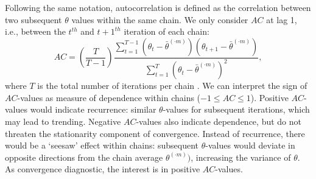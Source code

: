 \documentclass[article]{jss}
\begin{document}
Following the same notation, autocorrelation is defined as the correlation between two subsequent $\theta$ values within the same chain. We only consider $AC$ at lag 1, i.e., between the $t^{th}$ and $t+1^{th}$ iteration of each chain: 
%
\begin{equation*}
AC = \left( \frac{T}{T-1} \right) \frac{\sum_{t=1}^{T-1}(\theta_t - \bar{\theta}^{(\cdot m)})(\theta_{t+1} - \bar{\theta}^{(\cdot m)})}{\sum_{t=1}^{T}(\theta_t - \bar{\theta}^{(\cdot m)})^2},
\end{equation*}
%
where $T$ is the total number of iterations per chain \citep[p.~147]{lync07}. We can interpret the sign of $AC$-values as measure of dependence within chains ($-1 \leq AC \leq 1$). Positive $AC$-values would indicate recurrence: similar $\theta$-values for subsequent iterations, which may lead to trending. Negative $AC$-values also indicate dependence, but do not threaten the stationarity component of convergence. Instead of recurrence, there would be a `seesaw' effect within chains: subsequent $\theta$-values would deviate in opposite directions from the chain average $\theta^{(\cdot m)})$, increasing the variance of $\theta$. As convergence diagnostic, the interest is in positive $AC$-values.\footnotemark 
{}




% 
% 
% 
\end{document}

